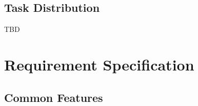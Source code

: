 \documentclass[conference]{IEEEtran}
\begin{document}
\vspace{0.7em} %

\subsection{Task Distribution}
\vspace{0.5em}
TBD

\vspace{1em} %

\section{Requirement Specification}

\vspace{1em} %

\subsection{Common Features}
\vspace{0.5em}
\end{document}
